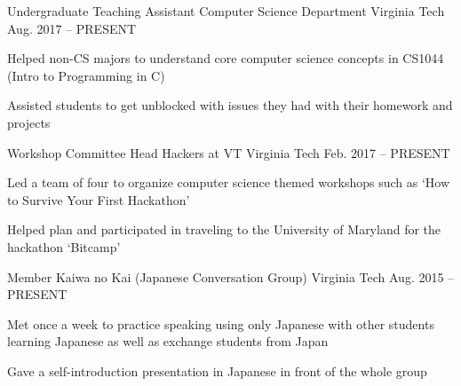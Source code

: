

\begin{cventries}

  \cventry
    {Undergraduate Teaching Assistant} %
    {Computer Science Department} %
    {Virginia Tech} %
    {Aug. 2017 – PRESENT} %
    {
      \begin{cvitems} %
        \item {Helped non-CS majors to understand core computer science concepts in CS1044 (Intro to Programming in C)}
        \item {Assisted students to get unblocked with issues they had with their homework and projects}
      \end{cvitems}
    }

  \cventry
    {Workshop Committee Head} %
    {Hackers at VT} %
    {Virginia Tech} %
    {Feb. 2017 – PRESENT} %
    {
      \begin{cvitems} %
        \item {Led a team of four to organize computer science themed workshops such as `How to Survive Your First Hackathon'}
        \item {Helped plan and participated in traveling to the University of Maryland for the hackathon `Bitcamp'}
      \end{cvitems}
    }

  \cventry
    {Member} %
    {Kaiwa no Kai (Japanese Conversation Group)} %
    {Virginia Tech} %
    {Aug. 2015 – PRESENT} %
    {
      \begin{cvitems} %
        \item {Met once a week to practice speaking using only Japanese with other students learning Japanese as well as exchange students from Japan}
        \item {Gave a self-introduction presentation in Japanese in front of the whole group}
      \end{cvitems}
    }

\end{cventries}
